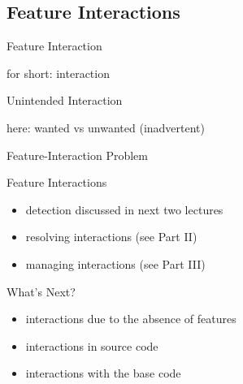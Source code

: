\subsection{Feature Interactions}
\begin{frame}{\myframetitle}
	\begin{mycolumns}
		\begin{definition}{Feature Interaction}

			for short: interaction
		\end{definition}
		\begin{definition}{Unintended Interaction}

			here: wanted vs unwanted (inadvertent)
		\end{definition}
	\mynextcolumn
		\begin{definition}{Feature-Interaction Problem}
		\end{definition}
		\begin{note}{Feature Interactions}
			\begin{itemize}
				\item detection discussed in next two lectures \lectureanalyses\ \lecturetesting
				\item resolving interactions (see Part II)
				\item managing interactions (see Part III)
			\end{itemize}
		\end{note}
		\begin{note}{What's Next?}
			\begin{itemize}
				\item interactions due to the absence of features
				\item interactions in source code
				\item interactions with the base code
			\end{itemize}
		\end{note}
	\end{mycolumns}
\end{frame}

